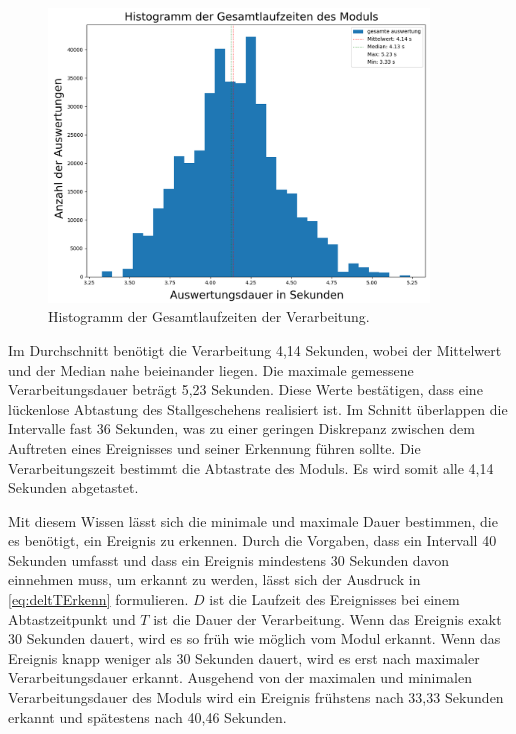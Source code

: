 \begin{figure}[htb]
    \centering
    \includegraphics[width=0.9\textwidth]{img/Plots/Simulation/Auswertung Runtimes Histogram gesamte auswertung mit Frames.png}
    \caption{Histogramm der Gesamtlaufzeiten der Verarbeitung.}
    \label{fig:HistGesamt}
\end{figure}

Im Durchschnitt benötigt die Verarbeitung 4,14 Sekunden, wobei der Mittelwert und der Median nahe beieinander liegen. Die maximale gemessene Verarbeitungsdauer beträgt 5,23 Sekunden. Diese Werte bestätigen, dass eine lückenlose Abtastung des Stallgeschehens realisiert ist. Im Schnitt überlappen die Intervalle fast 36 Sekunden, was zu einer geringen Diskrepanz zwischen dem Auftreten eines Ereignisses und seiner Erkennung führen sollte. Die Verarbeitungszeit bestimmt die Abtastrate des Moduls. Es wird somit alle 4,14 Sekunden abgetastet. \par

Mit diesem Wissen lässt sich die minimale und maximale Dauer bestimmen, die es benötigt, ein Ereignis zu erkennen. Durch die Vorgaben, dass ein Intervall 40 Sekunden umfasst und dass ein Ereignis mindestens 30 Sekunden davon einnehmen muss, um erkannt zu werden, lässt sich der Ausdruck in \autoref{eq:deltTErkenn} formulieren. \(D\) ist die Laufzeit des Ereignisses bei einem Abtastzeitpunkt und \(T\) ist die Dauer der Verarbeitung. Wenn das Ereignis exakt 30 Sekunden dauert, wird es so früh wie möglich vom Modul erkannt. Wenn das Ereignis knapp weniger als 30 Sekunden dauert, wird es erst nach maximaler Verarbeitungsdauer erkannt. Ausgehend von der maximalen und minimalen Verarbeitungsdauer des Moduls wird ein Ereignis frühstens nach 33,33 Sekunden erkannt und spätestens nach 40,46 Sekunden.


